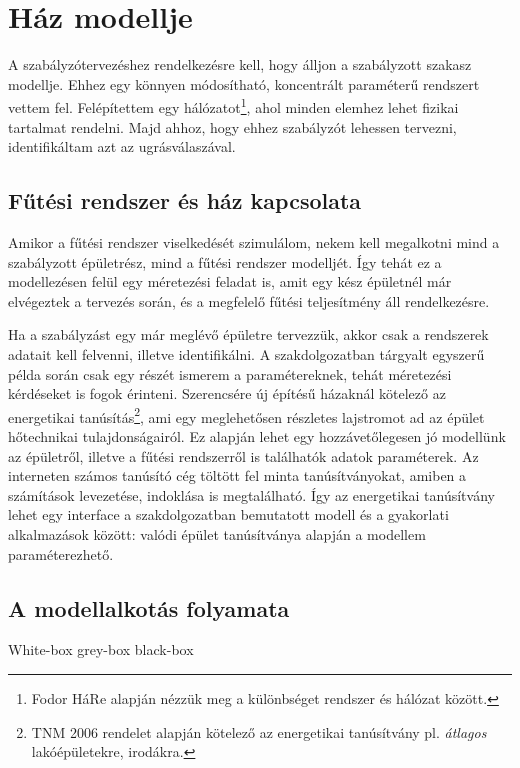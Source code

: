 \section{Ház modellje}

A szabályzótervezéshez rendelkezésre kell, hogy álljon a szabályzott szakasz modellje. Ehhez egy könnyen módosítható, koncentrált paraméterű rendszert vettem fel. Felépítettem egy hálózatot\footnote{Fodor HáRe alapján nézzük meg a különbséget rendszer és hálózat között.}, ahol minden elemhez lehet fizikai tartalmat rendelni. Majd ahhoz, hogy ehhez szabályzót lehessen tervezni, identifikáltam azt az ugrásválaszával.

\subsection{Fűtési rendszer és ház kapcsolata}

Amikor a fűtési rendszer viselkedését szimulálom, nekem kell megalkotni mind a szabályzott épületrész, mind a fűtési rendszer modelljét. Így tehát ez a modellezésen felül egy méretezési feladat is, amit egy kész épületnél már elvégeztek a tervezés során, és a megfelelő fűtési teljesítmény áll rendelkezésre. %

Ha a szabályzást egy már meglévő épületre tervezzük, akkor csak a rendszerek adatait kell felvenni, illetve identifikálni. A szakdolgozatban tárgyalt egyszerű példa során csak egy részét ismerem a paramétereknek, tehát méretezési kérdéseket is fogok érinteni.  Szerencsére új építésű házaknál kötelező az energetikai tanúsítás\footnote{TNM 2006 rendelet alapján kötelező az energetikai tanúsítvány pl. \textit{átlagos} lakóépületekre, irodákra.}, ami egy meglehetősen részletes lajstromot ad az épület hőtechnikai tulajdonságairól. Ez alapján lehet egy hozzávetőlegesen jó modellünk az épületről, illetve a fűtési rendszerről is találhatók adatok paraméterek. Az interneten számos tanúsító cég töltött fel minta tanúsítványokat, amiben a számítások levezetése, indoklása is megtalálható. Így az energetikai tanúsítvány lehet egy interface a szakdolgozatban bemutatott modell és a gyakorlati alkalmazások között: valódi épület tanúsítványa alapján a modellem paraméterezhető.

\subsection{A modellalkotás folyamata}

White-box
grey-box
black-box

